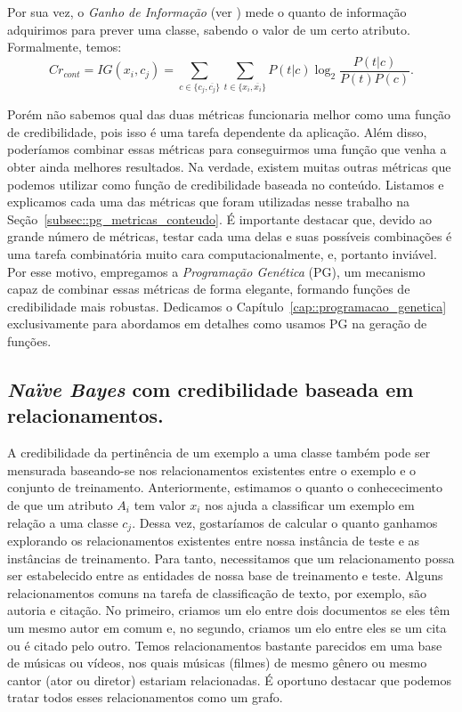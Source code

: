     Por sua vez, o \textit{Ganho de Informação} (ver \cite{forman03}) mede o quanto de informação adquirimos para prever uma classe, sabendo o valor de um certo atributo. Formalmente, temos:
\begin{equation}\label{eqn::classindependence_conteudo_ig}
   Cr_{cont} = IG(x_i, c_j) = \sum_{c \in \{c_j, \overline{c_j}\}}\sum_{t \in \{x_i, \overline{x_i}\}}P(t|c)\log_2\frac{P(t|c)}{P(t)P(c)}.
\end{equation}

    Porém não sabemos qual das duas métricas funcionaria melhor como uma função de credibilidade, pois isso é uma tarefa dependente da aplicação. Além disso, poderíamos combinar essas métricas para conseguirmos uma função que venha a obter ainda melhores resultados. Na verdade, existem muitas outras métricas que podemos utilizar como função de credibilidade baseada no conteúdo. Listamos e explicamos cada uma das métricas que foram utilizadas nesse trabalho na Seção~\ref{subsec::pg_metricas_conteudo}. É importante destacar que, devido ao grande número de métricas, testar cada uma delas e suas possíveis combinações é uma tarefa combinatória muito cara computacionalmente, e, portanto inviável. Por esse motivo, empregamos a \textit{Programação Genética} (\textsc{PG}), um mecanismo capaz de combinar essas métricas de forma elegante, formando funções de credibilidade mais robustas. Dedicamos o Capítulo~\ref{cap::programacao_genetica} exclusivamente para abordamos em detalhes como usamos \textsc{PG} na geração de funções.


\subsection{\textit{Naïve Bayes} com credibilidade baseada em relacionamentos.}
\label{subsubsec::nbcredgrafos}

A credibilidade da pertinência de um exemplo a uma classe também pode ser mensurada baseando-se nos relacionamentos existentes entre o exemplo e o conjunto de treinamento. Anteriormente, estimamos o quanto o conhececimento de que um atributo $A_i$ tem valor $x_i$ nos ajuda a classificar um exemplo em relação a uma classe $c_j$. Dessa vez, gostaríamos de calcular o quanto ganhamos explorando os relacionamentos existentes entre nossa instância de teste e as instâncias de treinamento. Para tanto, necessitamos que um relacionamento possa ser estabelecido entre as entidades de nossa base de treinamento e teste. Alguns relacionamentos comuns na tarefa de classificação de texto, por exemplo, são autoria e citação. No primeiro, criamos um elo entre dois documentos se eles têm um mesmo autor em comum e, no segundo, criamos um elo entre eles se um cita ou é citado pelo outro. Temos relacionamentos bastante parecidos em uma base de músicas ou vídeos, nos quais músicas (filmes) de mesmo gênero ou mesmo cantor (ator ou diretor) estariam relacionadas. É oportuno destacar que podemos tratar todos esses relacionamentos como um grafo.

